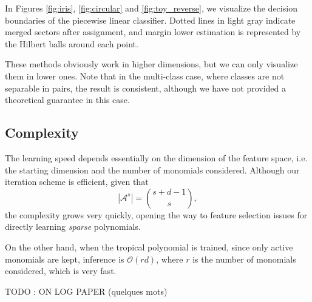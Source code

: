 \documentclass[oneside,english,a4paper]{amsart}
\numberwithin{equation}{section}
\numberwithin{figure}{section}
\theoremstyle{plain}
\theoremstyle{definition}
\theoremstyle{plain}
\theoremstyle{remark}
\theoremstyle{plain}
\theoremstyle{definition}
\theoremstyle{definition}
\begin{document}
In Figures \ref{fig:iris}, \ref{fig:circular} and \ref{fig:toy_reverse}, we visualize the decision boundaries of the piecewise linear classifier. Dotted lines in light gray indicate merged sectors after assignment, and margin lower estimation is represented by the Hilbert balls around each point.

These methods obviously work in higher dimensions, but we can only visualize them in lower ones. Note that in the multi-class case, where classes are not separable in pairs, the result is consistent, although we have not provided a theoretical guarantee in this case.

\subsection*{Complexity}

The learning speed depends essentially on the dimension of the feature space, i.e. the starting dimension and the number of monomials considered. Although our iteration scheme is efficient, given that $$|\mathcal{A}^s| = \binom{s+d-1}{s},$$ the complexity grows very quickly, opening the way to feature selection issues for directly learning \emph{sparse} polynomials.

On the other hand, when the tropical polynomial is trained, since only active monomials are kept, inference is $\mathcal{O}(rd)$, where $r$ is the number of monomials considered, which is very fast.

TODO : ON LOG PAPER (quelques mots)

\bigskip
\bigskip


\end{document}

